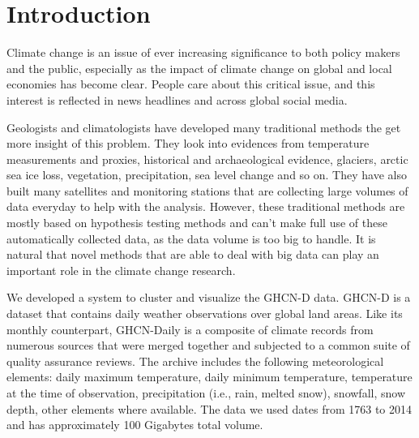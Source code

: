 \section{Introduction}
Climate change is an issue of ever increasing significance to both policy makers and the public, especially as the impact of climate change on global and local economies has become clear. People care about this critical issue, and this interest is reflected in news headlines and across global social media.

Geologists and climatologists have developed many traditional methods the get more insight of this problem. They look into evidences from temperature measurements and proxies, historical and archaeological evidence, glaciers, arctic sea ice loss, vegetation, precipitation, sea level change and so on. They have also built many satellites and monitoring stations that are collecting large volumes of data everyday to help with the analysis. However, these traditional methods are mostly based on hypothesis testing methods and can't make full use of these automatically collected data, as the data volume is too big to handle. It is natural that novel methods that are able to deal with big data can play an important role in the climate change research.

We developed a system to cluster and visualize the GHCN-D data\cite{GHCN-D}.
GHCN-D is a dataset that contains daily weather observations over global land areas.
Like its monthly counterpart, GHCN-Daily is a composite of climate records from
numerous sources that were merged together and subjected to a common suite of quality assurance reviews. The archive includes the following meteorological elements: daily maximum temperature, daily minimum temperature, temperature at the time of observation, precipitation (i.e., rain, melted snow), snowfall, snow depth, other elements where available. The data we used dates from 1763 to 2014 and has approximately 100 Gigabytes total volume.





